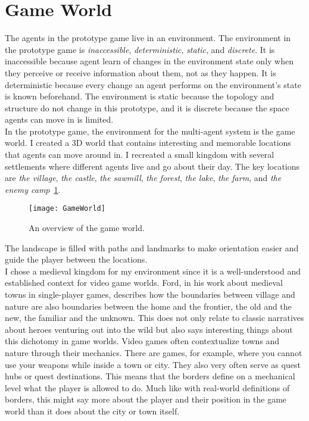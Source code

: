 \section{Game World}
The agents in the prototype game live in an environment. The environment in the prototype game is \textit{inaccessible}, \textit{deterministic}, \textit{static}, and \textit{discrete}. It is inaccessible because agent learn of changes in the environment state only when they perceive or receive information about them, not as they happen. It is deterministic because every change an agent performs on the environment's state is known beforehand. The environment is static because the topology and structure do not change in this prototype, and it is discrete because the space agents can move in is limited.\\
In the prototype game, the environment for the multi-agent system is the game world. I created a 3D world that contains interesting and memorable locations that agents can move around in. I recreated a small kingdom with several settlements where different agents live and go about their day. The key locations are \textit{the village}, \textit{the castle}, \textit{the sawmill}, \textit{the forest}, \textit{the lake}, \textit{the farm}, and \textit{the enemy camp}~\ref{fig:gameWorld}.
\begin{figure}
	\centering
	\texttt{[image: GameWorld]}
	\caption{An overview of the game world.}
	\label{fig:gameWorld}
\end{figure}
The landscape is filled with paths and landmarks to make orientation easier and guide the player between the locations.\\
I chose a medieval kingdom for my environment since it is a well-understood and established context for video game worlds. Ford, in his work about medieval towns in single-player games, describes how the boundaries between village and nature are also boundaries between the home and the frontier, the old and the new, the familiar and the unknown. This does not only relate to classic narratives about heroes venturing out into the wild but also says interesting things about this dichotomy in game worlds. Video games often contextualize towns and nature through their mechanics. There are games, for example, where you cannot use your weapons while inside a town or city. They also very often serve as quest hubs or quest destinations. This means that the borders define on a mechanical level what the player is allowed to do. Much like with real-world definitions of borders, this might say more about the player and their position in the game world than it does about the city or town itself.~\cite{Ford2019}
